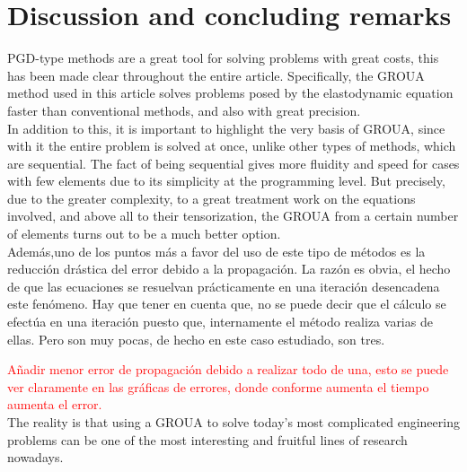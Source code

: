 \documentclass[a4paper, 10pt]{article}
\begin{document}

\newpage

\section{Discussion and concluding remarks}

PGD-type methods are a great tool for solving problems with great costs, this has been made clear throughout the entire article. Specifically, the GROUA method used in this article solves problems posed by the elastodynamic equation faster than conventional methods, and also with great precision.\\

In addition to this, it is important to highlight the very basis of GROUA, since with it the entire problem is solved at once, unlike other types of methods, which are sequential. The fact of being sequential gives more fluidity and speed for cases with few elements due to its simplicity at the programming level. But precisely, due to the greater complexity, to a great treatment work on the equations involved, and above all to their tensorization, the GROUA from a certain number of elements turns out to be a much better option.\\

Además,uno de los puntos más a favor del uso de este tipo de métodos es la reducción drástica del error debido a la propagación. La razón es obvia, el hecho de que las ecuaciones se resuelvan prácticamente en una iteración desencadena este fenómeno. Hay que tener en cuenta que, no se puede decir que el cálculo se efectúa en una iteración puesto que, internamente el método realiza varias de ellas. Pero son muy pocas, de hecho en este caso estudiado, son tres.

\textcolor{Red}{Añadir menor error de propagación debido a realizar todo de una, esto se puede ver claramente en las gráficas de errores, donde conforme aumenta el tiempo aumenta el error.}\\

The reality is that using a GROUA to solve today's most complicated engineering problems can be one of the most interesting and fruitful lines of research nowadays.\\
\end{document}
